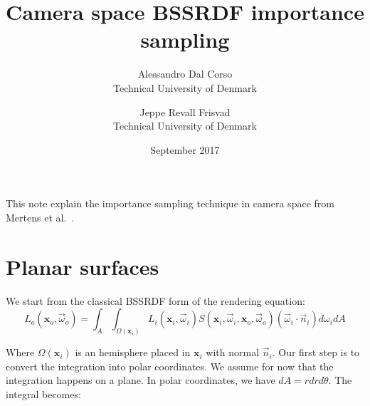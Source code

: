 \documentclass[10pt,a4paper]{article}
\title{Camera space BSSRDF importance sampling}
\date{September 2017}
\author{Alessandro Dal Corso \\ Technical University of Denmark \and Jeppe Revall Frisvad \\ Technical University of Denmark
}
\begin{document}
\maketitle
\newcommand{\vecfunc}[2] {\vec{#1}(\mathbf{#2})}
\newcommand{\func}[2] {{#1}(\mathbf{#2})}
\newcommand{\omegafunc}[2] {{#1}(\mathbf{#2}, \vec{\omega})}


\newcommand{\xvecfunc}[1] {\vecfunc{#1}{x}}
\newcommand{\xfunc}[1] {\func{#1}{x}}
\newcommand{\xomegafunc}[1] {\omegafunc{#1}{x}}
\newcommand{\nablavec} {{\nabla}}
\newcommand{\omegavec} {\vec{\omega}}
\newcommand{\sphere}[2] {\int_{4\pi}{#1}\ d{\ifthenelse{\isempty{#2}{}}{{\omega}}{#2}}}
\newcommand{\hemisphere}[2] {\int_{2\pi_+}{#1}\ d{\ifthenelse{\isempty{#2}{}}{{\omega}}{#2}}}
\newcommand{\inwardhemisphere}[2] {\int_{2\pi_-}{#1}\ d{\ifthenelse{\isempty{#2}{}}{{\omega}}{#2}}}

\newcommand{\absorption}{\sigma_a}
\newcommand{\transmission}{\sigma_{tr}}
\newcommand{\scattering}{\sigma_s}
\newcommand{\extinction}{\sigma_t}
\newcommand{\fluence}{G_0}
\newcommand{\flux}{\mathbf{G}_1}
\newcommand{\sourcezero}[1]{\func{q}{#1}}
\newcommand{\sourcezerox}{\xfunc{q}}
\newcommand{\sourceone}[1]{\vec{\mathbf{Q}}(\mathbf{#1}, \omegavec)}
\newcommand{\sourceonex}{\vec{\mathbf{Q}}(\mathbf{x}, \omegavec)}
\newcommand{\redsca}{{\sigma}'_s}
\newcommand{\redext}{{\sigma}'_t}
\newcommand{\redscaEddington}{\tilde{\sigma}_s}
\newcommand{\redextEddington}{\tilde{\sigma}_t}
\newcommand{\de}{\text{d}}
\newcommand{\cphi}{C_{\phi}}
\newcommand{\cE}{C_{\mathbf{E}}}
\newcommand{\nvec} {\vec{n}}
\newcommand{\radius} {r}

This note explain the importance sampling technique in camera space from Mertens et al.~\cite{Mertens2003}.

\section{Planar surfaces}
We start from the classical BSSRDF form of the rendering equation:
\begin{equation*}
L_o(\mathbf{x}_o, \omegavec_o) = \int_A \int_{\Omega(\mathbf{x}_i)} L_i(\mathbf{x}_i, \omegavec_i) S(\mathbf{x}_i, \omegavec_i, \mathbf{x}_o, \omegavec_o) (\omegavec_i \cdot \nvec_i) d\omega_i dA
\end{equation*}

Where $\Omega(\mathbf{x}_i)$ is an hemisphere placed in $\mathbf{x}_i$ with normal $\nvec_i$.
Our first step is to convert the integration into polar coordinates. We assume for now that the integration happens on a plane. In polar coordinates, we have $dA = r dr d\theta$. The integral becomes:
\end{document}
